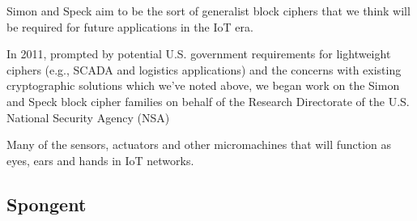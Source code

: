 \documentclass{article}
\begin{document}
Simon and Speck aim to be the sort of generalist block ciphers that we think will be required for future applications in the IoT era.

In 2011, prompted by potential U.S. government requirements for lightweight ciphers (e.g., SCADA and logistics applications) and the concerns with existing cryptographic solutions which we’ve noted above, we began work on the Simon and Speck block cipher families on behalf of the Research Directorate of the U.S. National Security Agency (NSA)


Many of the sensors, actuators and other micromachines that will function as eyes, ears and hands in IoT networks.

\subsection{Spongent}
\end{document}
